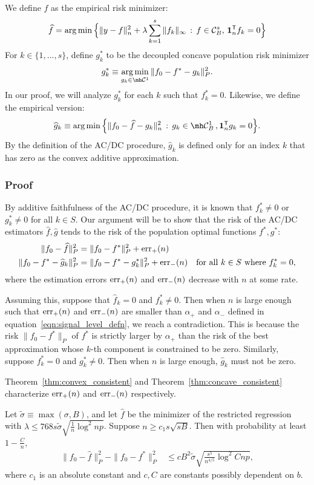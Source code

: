 We define $\hat{f}$ as the empirical risk minimizer:
\[
\widehat{f} = \arg\min \Big \{ \| y - f \|_n^2 + \lambda \sum_{k=1}^s \| f_k \|_\infty 
    \,:\, f \in \mathcal{C}^s_B,\, \mbox{\boldmath $1$}_n^{\mathsf{T}} f_k = 0 \Big \}
\]
For $k \in \{1,...,s\}$, define $g^*_k$ to be the decoupled concave population risk minimizer
\[
g^*_k \equiv \argmin_{g_k \in \mh \mathcal{C}^1} \| f_0 - f^* - g_k \|_P^2 .
\]
In our proof, we will analyze $g^*_k$ for each $k$ such that $f^*_k = 0$. Likewise, we define the empirical version:
\[
\hat{g}_k \equiv \argmin \Big\{ \| f_0 - \hat{f} - g_k \|_n^2 \,:\, g_k \in \mh \mathcal{C}^1_B \,, \mathbf{1}_n^\tran g_k = 0 \Big\}.
\]
By the definition of the AC/DC procedure, $\hat{g}_k$ is defined only
for an index $k$ that has zero as the convex additive approximation.


\subsubsection{Proof}
 
By additive faithfulness of the AC/DC procedure, it is known that $f^*_k \neq 0$ or $g^*_k \neq 0$ for all $k \in S$. 
Our argument will be to show that the risk of the AC/DC estimators $\hat{f}, \hat{g}$ tends to the risk of the population optimal functions $f^*, g^*$:
\begin{align*}
\| f_0 - \widehat{f} \|^2_P & = \| f_0 - f^* \|^2_P + \textrm{err}_+(n) \\
\| f_0 - f^* - \widehat{g}_k \|^2_P &=  \| f_0 - f^* - g^*_k \|^2_P + \textrm{err}_-(n) 
       \quad \textrm{for all $k \in S$ where $f^*_k = 0$},
\end{align*}
where the estimation errors $\textrm{err}_+(n)$ and $\textrm{err}_-(n)$ decrease with $n$ at some rate. 

Assuming this, suppose that $\hat{f}_k = 0$ and $f^*_k \neq 0$. Then when $n$ is large
enough such that $\textrm{err}_+(n)$ and $\textrm{err}_-(n)$ are smaller
than $\alpha_+$ and $\alpha_-$ defined in
equation~\eqref{eqn:signal_level_defn}, we reach a contradiction.
This is because the risk $\| f_0 - f^* \|_P$ of $f^*$ is
strictly larger by $\alpha_+$ than the risk of the best approximation
whose $k$-th component is constrained to be zero.
Similarly, suppose $f^*_k = 0$ and $g^*_k \neq 0$. Then when $n$ is large
enough, $\hat{g}_k$ must not be zero.

Theorem~\ref{thm:convex_consistent} and
Theorem~\ref{thm:concave_consistent} characterize $\textrm{err}_+(n)$ and
$\textrm{err}_-(n)$ respectively.

\begin{theorem}
\label{thm:convex_consistent}
Let $\tilde{\sigma} \equiv \max(\sigma, B)$, and let $\hat{f}$ be the
minimizer of the restricted regression with $\lambda \leq 768 s
\tilde{\sigma} \sqrt{ \frac{1}{n} \log^2 np}$.
Suppose $n \geq c_1 s \sqrt{sB}$.
Then with probability at least $1-\frac{C}{n}$,
\begin{align}
\|f_0 - \hat{f} \|_P^2 - \| f_0 - f^* \|_P^2 
&\leq c B^2 \tilde{\sigma} \sqrt{ \frac{s^5}{n^{4/5}} \log^2 Cnp},
\end{align}
where $c_1$ is an absolute constant and $c, C$ are constants possibly dependent on $b$.
\end{theorem}


